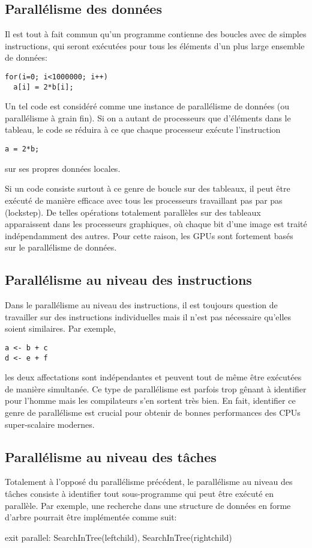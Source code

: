 	\subsection{Parallélisme des données}
	Il est tout à fait commun qu'un programme contienne des boucles avec de simples instructions, qui seront exécutées pour tous les éléments d'un plus large ensemble de données:
\begin{verbatim}
for(i=0; i<1000000; i++)
  a[i] = 2*b[i];	
\end{verbatim}
	
	Un tel code est considéré comme une instance de parallélisme de données (ou parallélisme à grain fin). Si on a autant de processeurs que d'éléments dans le tableau, le code se réduira à ce que chaque processeur exécute l'instruction
\begin{verbatim}
a = 2*b;	
\end{verbatim}
	sur ses propres données locales.
	
	Si un code consiste surtout à ce genre de boucle sur des tableaux, il peut être exécuté de manière efficace avec tous les processeurs travaillant pas par pas (lockstep). De telles opérations totalement parallèles sur des tableaux apparaissent dans les processeurs graphiques, où chaque bit d'une image est traité indépendamment des autres. Pour cette raison, les GPUs sont fortement basés sur le parallélisme de données.
	
	\subsection{Parallélisme au niveau des instructions}
	Dans le parallélisme au niveau des instructions, il est toujours question de travailler sur des instructions individuelles mais il n'est pas nécessaire qu'elles soient similaires. Par exemple,
\begin{verbatim}
a <- b + c
d <- e + f	
\end{verbatim}
	les deux affectations sont indépendantes et peuvent tout de même être exécutées de manière simultanée. Ce type de parallélisme est parfois trop gênant à identifier pour l'homme mais les compilateurs s'en sortent très bien. En fait, identifier ce genre de parallélisme est crucial pour obtenir de bonnes performances des CPUs super-scalaire modernes.
	
	\subsection{Parallélisme au niveau des tâches}
	Totalement à l'opposé du parallélisme précédent, le parallélisme au niveau des tâches consiste à identifier tout sous-programme qui peut être exécuté en parallèle. Par exemple, une recherche dans une structure de données en forme d'arbre pourrait être implémentée comme suit: 
	\begin{algorithmic}
		\STATE exit 
	\ELSE
		\STATE parallel: SearchInTree(leftchild), SearchInTree(rightchild)
	\ENDIF
	\end{algorithmic}
	
